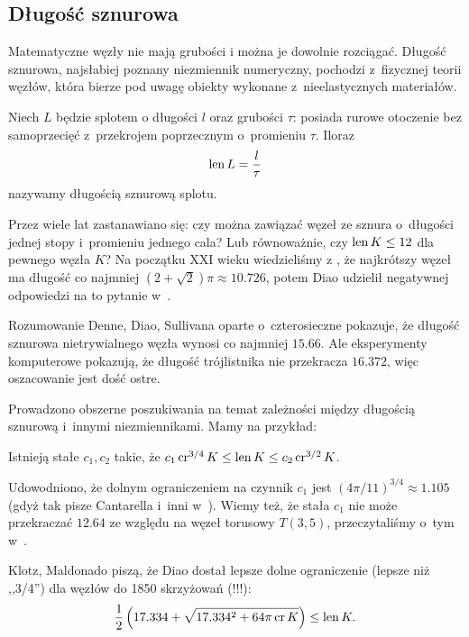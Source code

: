 
\subsection{Długość sznurowa}
%
Matematyczne węzły nie mają grubości i można je dowolnie rozciągać.
Długość sznurowa, najsłabiej poznany niezmiennik numeryczny, pochodzi z~fizycznej teorii węzłów, która bierze pod uwagę obiekty wykonane z~nieelastycznych materiałów.

\begin{definition}
    Niech $L$ będzie splotem o długości $l$ oraz grubości $\tau$: posiada rurowe otoczenie bez samoprzecięć z~przekrojem poprzecznym o~promieniu $\tau$.
    Iloraz
    \begin{equation}
        \operatorname{len} L = \frac l \tau
    \end{equation}
    nazywamy długością sznurową splotu.
\end{definition}

Przez wiele lat zastanawiano się: czy można zawiązać węzeł ze sznura o~długości jednej stopy i~promieniu jednego cala?
Lub równoważnie, czy $\operatorname{len} K \le 12$ dla pewnego węzła $K$?
Na początku XXI wieku wiedzieliśmy z \cite{cantarella02}, że najkrótszy węzeł ma długość co najmniej $(2 + \sqrt 2)\pi \approx 10.726$, potem Diao udzielił negatywnej odpowiedzi na to pytanie w~\cite[s. 14]{diao03}.

Rozumowanie Denne, Diao, Sullivana \cite{denne06} oparte o~czterosieczne pokazuje, że długość sznurowa nietrywialnego węzła wynosi co najmniej $15.66$.
Ale eksperymenty komputerowe pokazują, że długość trójlistnika nie przekracza $16.372$, więc oszacowanie jest dość ostre.

Prowadzono obszerne poszukiwania na temat zależności między długością sznurową i~innymi niezmiennikami.
Mamy na przykład:

\begin{proposition}
    Istnieją stałe $c_1, c_2$ takie, że $c_1 \operatorname{cr}^{3/4} K \le \operatorname{len} K \le c_2 \operatorname{cr}^{3/2} K$.
\end{proposition}

Udowodniono, że dolnym ograniczeniem na czynnik $c_1$ jest $(4\pi/11)^{3/4} \approx 1.105$ (gdyż tak pisze Cantarella i~inni w~\cite[tw. 23]{cantarella02}).
Wiemy też, że stała $c_1$ nie może przekraczać $12.64$ ze względu na węzeł torusowy $T(3, 5)$, przeczytaliśmy o~tym w~\cite{klotz21}.

Klotz, Maldonado \cite{klotz21} piszą, że Diao dostał lepsze dolne ograniczenie (lepsze niż ,,3/4'') dla węzłów do 1850 skrzyżowań (!!!):
\begin{equation}
    \frac 12 \left(17.334 + \sqrt{17.334^2 + 64 \pi \operatorname{cr} K}\right) \le \operatorname{len} K.
\end{equation}

